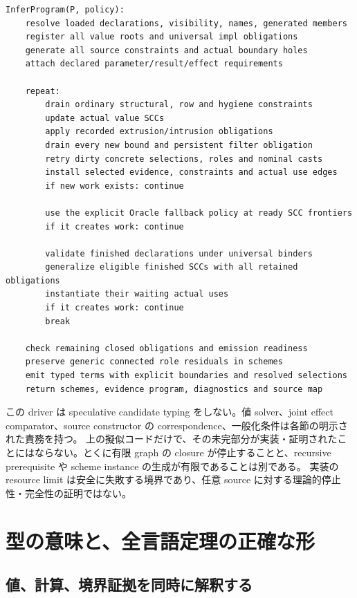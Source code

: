 \documentclass[11pt,a4paper]{article}
\theoremstyle{remark}
\begin{document}
\begin{Verbatim}[fontsize=\small]
InferProgram(P, policy):
    resolve loaded declarations, visibility, names, generated members
    register all value roots and universal impl obligations
    generate all source constraints and actual boundary holes
    attach declared parameter/result/effect requirements

    repeat:
        drain ordinary structural, row and hygiene constraints
        update actual value SCCs
        apply recorded extrusion/intrusion obligations
        drain every new bound and persistent filter obligation
        retry dirty concrete selections, roles and nominal casts
        install selected evidence, constraints and actual use edges
        if new work exists: continue

        use the explicit Oracle fallback policy at ready SCC frontiers
        if it creates work: continue

        validate finished declarations under universal binders
        generalize eligible finished SCCs with all retained obligations
        instantiate their waiting actual uses
        if it creates work: continue
        break

    check remaining closed obligations and emission readiness
    preserve generic connected role residuals in schemes
    emit typed terms with explicit boundaries and resolved selections
    return schemes, evidence program, diagnostics and source map
\end{Verbatim}

この driver は speculative candidate typing をしない。値 solver、joint effect comparator、source constructor の correspondence、一般化条件は各節の明示された責務を持つ。
上の擬似コードだけで、その未完部分が実装・証明されたことにはならない。とくに有限 graph の closure が停止することと、recursive prerequisite や scheme instance の生成が有限であることは別である。
実装の resource limit は安全に失敗する境界であり、任意 source に対する理論的停止性・完全性の証明ではない。

\section{型の意味と、全言語定理の正確な形}

\subsection{値、計算、境界証拠を同時に解釈する}
\end{document}
